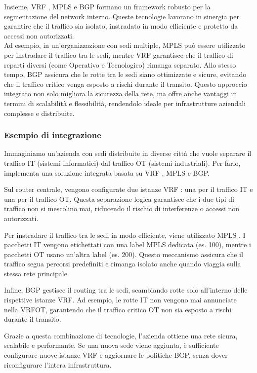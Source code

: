             Insieme, VRF , MPLS e BGP formano un framework robusto per la segmentazione del network interno. Queste tecnologie lavorano in sinergia per garantire che il traffico sia isolato, instradato in modo efficiente e protetto da accessi non autorizzati.\\
            Ad esempio, in un'organizzazione con sedi multiple, MPLS può essere utilizzato per instradare il traffico tra le sedi, mentre VRF garantisce che il traffico di reparti diversi (come Operativo e Tecnologico) rimanga separato. Allo stesso tempo, BGP assicura che le rotte tra le sedi siano ottimizzate e sicure, evitando che il traffico critico venga esposto a rischi durante il transito.
            Questo approccio integrato non solo migliora la sicurezza della rete, ma offre anche vantaggi in termini di scalabilità e flessibilità, rendendolo ideale per infrastrutture aziendali complesse e distribuite.

            \subsubsection{Esempio di integrazione}
                Immaginiamo un'azienda con sedi distribuite in diverse città che vuole separare il traffico IT (sistemi informatici) dal traffico OT (sistemi industriali). Per farlo, implementa una soluzione integrata basata su VRF , MPLS e BGP.

                Sul router centrale, vengono configurate due istanze VRF : una per il traffico IT e una per il traffico OT. Questa separazione logica garantisce che i due tipi di traffico non si mescolino mai, riducendo il rischio di interferenze o accessi non autorizzati.
                
                Per instradare il traffico tra le sedi in modo efficiente, viene utilizzato MPLS . I pacchetti IT vengono etichettati con una label MPLS dedicata (es. 100), mentre i pacchetti OT usano un'altra label (es. 200). Questo meccanismo assicura che il traffico segua percorsi predefiniti e rimanga isolato anche quando viaggia sulla stessa rete principale.
                
                Infine, BGP gestisce il routing tra le sedi, scambiando rotte solo all'interno delle rispettive istanze VRF. Ad esempio, le rotte IT non vengono mai annunciate nella VRF\textunderscore OT, garantendo che il traffico critico OT non sia esposto a rischi durante il transito.
                
                Grazie a questa combinazione di tecnologie, l'azienda ottiene una rete sicura, scalabile e performante. Se una nuova sede viene aggiunta, è sufficiente configurare nuove istanze VRF e aggiornare le politiche BGP, senza dover riconfigurare l'intera infrastruttura.

